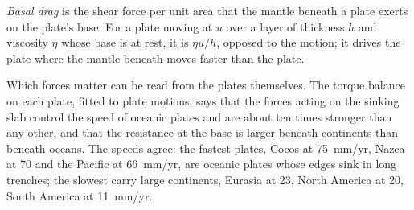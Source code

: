 \begin{omfigure}

\par{}\label{fig:b3:mantle-convection:ridge-push}
\end{omfigure}

\begin{definition}\label{def:b3:mantle-convection:basal-drag}
\emph{Basal drag} is the shear force per unit area that the
mantle beneath a plate exerts on the plate's base. For a plate moving at $u$
over a layer of thickness $h$ and viscosity $\eta$ whose base is at rest, it is
$\eta u/h$, opposed to the motion; it drives the plate where the mantle beneath
moves faster than the plate.
\end{definition}

Which forces matter can be read from the plates themselves. The torque balance
on each plate, fitted to plate motions, says that the forces acting on the
sinking slab control the speed of oceanic plates and are about ten times
stronger than any other, and that the resistance at the base is larger beneath
continents than beneath oceans. The speeds agree: the fastest plates, Cocos at
\qty{75}{mm/yr}, Nazca at 70 and the Pacific at \qty{66}{mm/yr}, are oceanic
plates whose edges sink in long trenches; the slowest carry large continents,
Eurasia at 23, North America at 20, South America at \qty{11}{mm/yr}.


